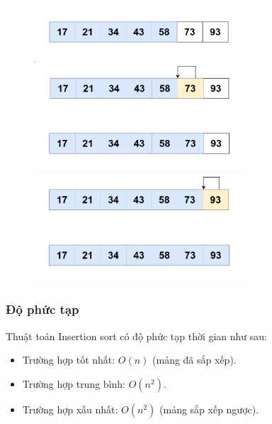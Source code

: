 \begin{figure}[H]
    \centering
    \includegraphics[width=0.7\textwidth]{img/insertion sort_lan2/9.png}
    \includegraphics[width=0.7\textwidth]{img/insertion sort_lan2/10.png}
    \includegraphics[width=0.7\textwidth]{img/insertion sort_lan2/11.png}
    \includegraphics[width=0.7\textwidth]{img/insertion sort_lan2/12.png}
    \includegraphics[width=0.7\textwidth]{img/insertion sort_lan2/13.png}

\end{figure}


\subsubsection{Độ phức tạp}
Thuật toán Insertion sort có độ phức tạp thời gian như sau:
\begin{itemize}
    \item Trường hợp tốt nhất: $O(n)$ (mảng đã sắp xếp).
    \item Trường hợp trung bình: $O(n^2)$.
    \item Trường hợp xấu nhất: $O(n^2)$ (mảng sắp xếp ngược).
\end{itemize}